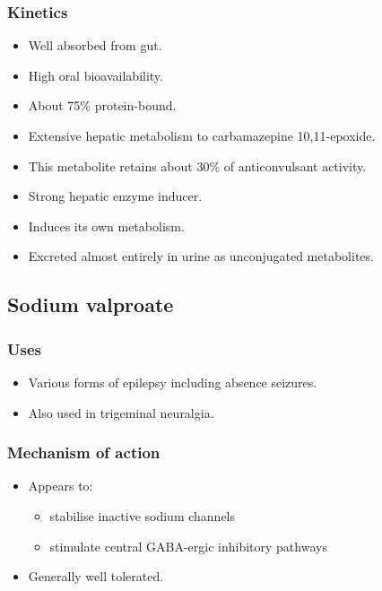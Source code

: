 \documentclass[11pt,a4paper]{article}
\begin{document}
\subsubsection{Kinetics}
\begin{itemize}
  \item Well absorbed from gut.
  \item High oral bioavailability.
  \item About 75\% protein-bound.
  \item Extensive hepatic metabolism to carbamazepine 10,11-epoxide.
  \item This metabolite retains about 30\% of anticonvulsant activity.
  \item Strong hepatic enzyme inducer.
  \item Induces its own metabolism.
  \item Excreted almost entirely in urine as unconjugated metabolites.
\end{itemize}

\subsection{Sodium valproate}

\subsubsection{Uses}
\begin{itemize}
  \item Various forms of epilepsy including absence seizures.
  \item Also used in trigeminal neuralgia.
\end{itemize}

\subsubsection{Mechanism of action}
\begin{itemize}
  \item Appears to:
  \begin{itemize}
    \item stabilise inactive sodium channels
    \item stimulate central GABA-ergic inhibitory pathways
  \end{itemize}
  \item Generally well tolerated.
\end{itemize}
\end{document}
